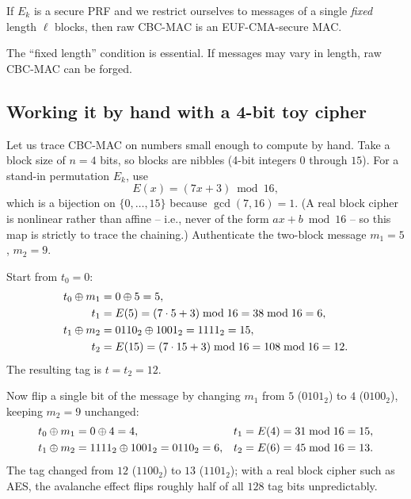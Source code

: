 \begin{theorem}
\label{ch15:cbcmac-thm}
If $E_k$ is a secure PRF and we restrict ourselves to messages of a single \emph{fixed} length $\ell$ blocks, then raw CBC-MAC is an EUF-CMA-secure MAC.
\end{theorem}

The ``fixed length'' condition is essential. If messages may vary in length, raw CBC-MAC can be forged.

\subsection{Working it by hand with a 4-bit toy cipher}
\label{ch15:cbcmac-toy}

Let us trace CBC-MAC on numbers small enough to compute by hand. Take a block size of $n = 4$ bits, so blocks are nibbles (4-bit integers $0$ through $15$). For a stand-in permutation $E_k$, use
\[
  E(x) = (7x + 3) \bmod 16,
\]
which is a bijection on $\{0,\dots,15\}$ because $\gcd(7,16)=1$. (A real block cipher is nonlinear rather than affine -- i.e., never of the form $ax + b \bmod 16$ -- so this map is strictly to trace the chaining.) Authenticate the two-block message $m_1 = 5$, $m_2 = 9$.

\begin{walkbox}
Start from $t_0 = 0$:
\begin{align*}
  t_0 \oplus m_1 &= 0 \oplus 5 = 5, \\
  t_1 &= E(5) = (7 \cdot 5 + 3) \bmod 16 = 38 \bmod 16 = 6, \\
  t_1 \oplus m_2 &= 0110_2 \oplus 1001_2 = 1111_2 = 15, \\
  t_2 &= E(15) = (7 \cdot 15 + 3) \bmod 16 = 108 \bmod 16 = 12.
\end{align*}
The resulting tag is $t = t_2 = 12$.
\end{walkbox}

Now flip a single bit of the message by changing $m_1$ from $5$ ($0101_2$) to $4$ ($0100_2$), keeping $m_2 = 9$ unchanged:
\begin{align*}
  t_0 \oplus m_1 &= 0 \oplus 4 = 4,
    & t_1 &= E(4) = 31 \bmod 16 = 15, \\
  t_1 \oplus m_2 &= 1111_2 \oplus 1001_2 = 0110_2 = 6,
    & t_2 &= E(6) = 45 \bmod 16 = 13.
\end{align*}
The tag changed from $12$ ($1100_2$) to $13$ ($1101_2$); with a real block cipher such as AES, the avalanche effect flips roughly half of all $128$ tag bits unpredictably.


